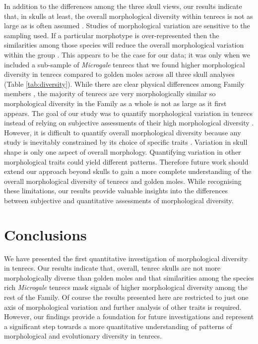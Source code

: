 \documentclass[12pt,a4paper]{article}
\begin{document}
	
	In addition to the differences among the three skull views, our results indicate that, in skulls at least, the overall morphological diversity within tenrecs is not as large as is often assumed \citep[e.g.][]{Eisenberg1969, Olson2013}. Studies of morphological variation are sensitive to the sampling used. If a particular morphotype is over-represented then the similarities among those species will reduce the overall morphological variation within the group \citep{Foote1991}. This appears to be the case for our data; it was only when we included a sub-sample of \textit{Microgale} tenrecs that we found higher morphological diversity in tenrecs compared to golden moles across all three skull analyses (Table \ref{tab:diversity}).
	While there are clear physical differences among Family members \citep{Olson2013, Eisenberg1969}, the majority of tenrecs are very morphologically similar \citep{Jenkins2003} so morphological diversity in the Family as a whole is not as large as it first appears.  
	The goal of our study was to quantify morphological variation in tenrecs instead of relying on subjective assessments of their high morphological diversity \citep{Olson2013, Soarimalala2011, Eisenberg1969}. However, it is difficult to quantify overall morphological diversity because any study is inevitably constrained by its choice of specific traits \citep{Roy1997}. Variation in skull shape is only one aspect of overall morphology. Quantifying variation in other morphological traits could yield different patterns. Therefore future work should extend our approach beyond skulls to gain a more complete understanding of the overall morphological diversity of tenrecs and golden moles.
	While recognising these limitations, our results provide valuable insights into the differences between subjective and quantitative assessments of morphological diversity. 
\section{Conclusions}
	We have presented the first quantitative investigation of morphological diversity in tenrecs. Our results indicate that, overall, tenrec skulls are not more morphologically diverse than golden moles and that similarities among the species rich \textit{Microgale} tenrecs mask signals of higher morphological diversity among the rest of the Family. Of course the results presented here are restricted to just one axis of morphological variation and further analysis of other traits is required. However, our findings provide a foundation for future investigations and represent a significant step towards a more quantitative understanding of patterns of morphological and evolutionary diversity in tenrecs. 
\end{document}

